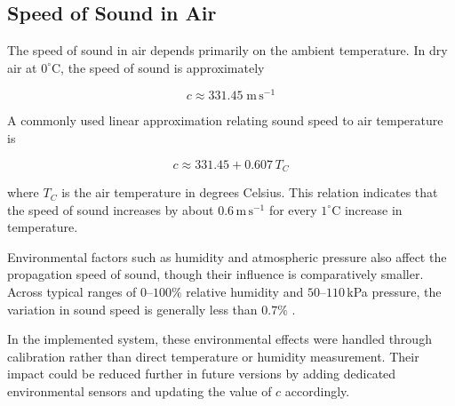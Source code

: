 \subsection{Speed of Sound in Air}

The speed of sound in air depends primarily on the ambient
temperature. In dry air at $0^\circ$C, the speed of sound is
approximately

\begin{equation}
c \approx 331.45 \; \mathrm{m\,s^{-1}}
\end{equation}

A commonly used linear approximation relating sound speed
to air temperature is \cite{mi13040520}

\begin{equation}
c \approx 331.45 + 0.607\,T_C
\end{equation}

where $T_C$ is the air temperature in degrees Celsius. This
relation indicates that the speed of sound increases by about
$0.6\,\mathrm{m\,s^{-1}}$ for every $1^\circ$C increase in
temperature.

Environmental factors such as humidity and atmospheric
pressure also affect the propagation speed of sound, though
their influence is comparatively smaller. Across typical
ranges of $0$--$100\%$ relative humidity and
$50$--$110$\,kPa pressure, the variation in sound speed is
generally less than $0.7\%$ \cite{mi13040520}.

In the implemented system, these environmental effects were
handled through calibration rather than direct temperature or
humidity measurement. Their impact could be reduced further in
future versions by adding dedicated environmental sensors and
updating the value of $c$ accordingly.
